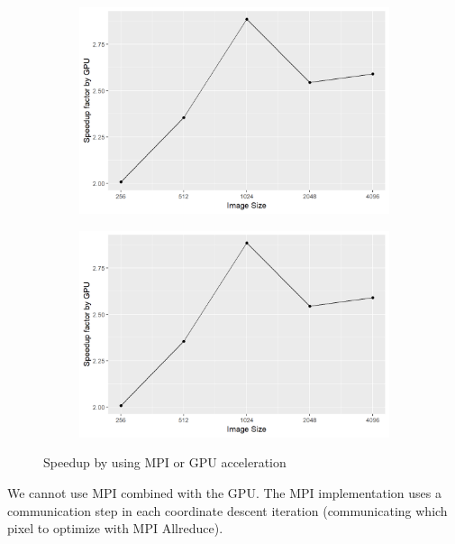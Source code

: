 \begin{figure}[h]
	\centering
		\begin{subfigure}[b]{0.4\linewidth}
		\includegraphics[width=1.00\linewidth]{./chapters/10.results/speedup/gpu.png}
	\end{subfigure}
	\begin{subfigure}[b]{0.4\linewidth}
		\includegraphics[width=1.00\linewidth]{./chapters/10.results/speedup/gpu.png}
	\end{subfigure}
	\caption{Speedup by using MPI or GPU acceleration}
	\label{results:speedup:figure}
\end{figure}


We cannot use MPI combined with the GPU. The MPI implementation uses a communication step in each coordinate descent iteration (communicating which pixel to optimize with MPI Allreduce). 



